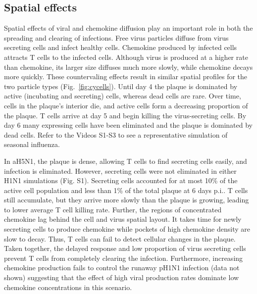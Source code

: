 \documentclass[10pt]{article}
\begin{document}

\subsection*{Spatial effects}

Spatial effects of viral and chemokine diffusion play an important role in both the spreading and clearing of infections.  Free virus particles diffuse from virus secreting cells and infect healthy cells.  Chemokine produced by infected cells attracts T cells to the infected cells.  Although virus is produced at a higher rate than chemokine, its larger size diffuses much more slowly, while chemokine decays more quickly.  These countervaling effects result in similar spatial profiles for the two particle types (Fig.~\ref{fig:cycells}). Until day 4 the plaque is dominated by active (incubating and secreting) cells, whereas dead cells are rare. Over time, cells in the plaque's interior die, and active cells form a decreasing proportion of the plaque. T cells arrive at day 5 and begin killing the virus-secreting cells. By day 6 many expressing cells have been eliminated and the plaque is dominated by dead cells.  Refer to the Videos S1-S3 to see a representative simulation of seasonal influenza.

In aH5N1, the plaque is dense, allowing T cells to find secreting cells easily, and infection is eliminated.  However, secreting cells were not eliminated in either H1N1 simulations (Fig. S1).  Secreting cells accounted for at most 10\% of the active cell population and less than 1\% of the total plaque at 6 days p.i..  T cells still accumulate, but they arrive more slowly than the plaque is growing, leading to lower average T cell killing rate.  Further, the regions of concentrated chemokine lag behind the cell and virus spatial layout.  It takes time for newly secreting cells to produce chemokine while pockets of high chemokine density are slow to decay.  Thus, T cells can fail to detect cellular changes in the plaque.  Taken together, the delayed response and low proportion of virus secreting cells prevent T cells from completely clearing the infection.  Furthermore, increasing chemokine production fails to control the runaway pH1N1 infection (data not shown) suggesting that the effect of high viral production rates dominate low chemokine concentrations in this scenario.
\end{document}
